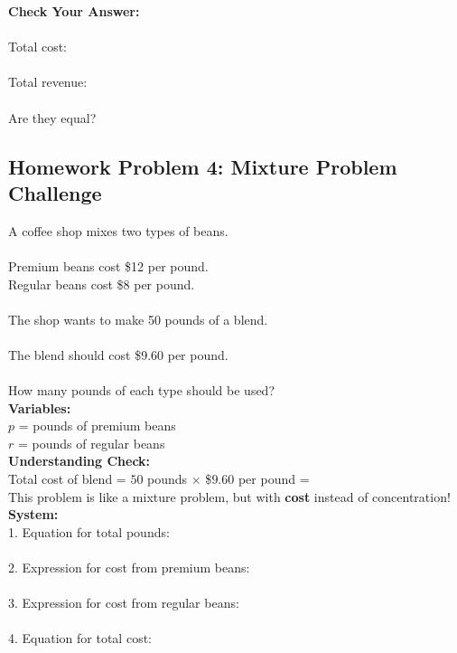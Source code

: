\documentclass[12pt]{article}
\begin{document}
            \textbf{Check Your Answer:}\\\\
            Total cost: \underline{\hspace{5in}}\\\\
            Total revenue: \underline{\hspace{2in}}\\\\
            Are they equal? \underline{\hspace{1in}}
        
            \newpage
        
        \subsection*{Homework Problem 4: Mixture Problem Challenge}

            A coffee shop mixes two types of beans.\\\\
            Premium beans cost \$12 per pound.\\
            Regular beans cost \$8 per pound.\\\\
            The shop wants to make 50 pounds of a blend.\\\\
            The blend should cost \$9.60 per pound.\\\\
            How many pounds of each type should be used?\\
        
            \textbf{Variables:}\\
            $p$ = pounds of premium beans\\
            $r$ = pounds of regular beans\\
        
            \textbf{Understanding Check:}\\
            Total cost of blend = $50$ pounds $\times$ \$$9.60$ per pound = \underline{\hspace{1in}}\\
            This problem is like a mixture problem, but with \textbf{cost} instead of concentration!\\
        
            \textbf{System:}\\
            1. Equation for total pounds: \underline{\hspace{4in}}\\\\
            2. Expression for cost from premium beans: \underline{\hspace{3.5in}}\\\\
            3. Expression for cost from regular beans: \underline{\hspace{3.5in}}\\\\
            4. Equation for total cost: \underline{\hspace{4in}}\\
        
\end{document}
